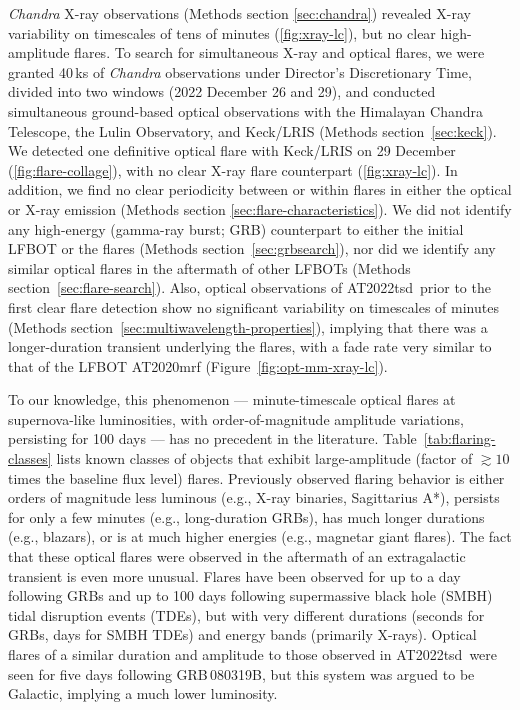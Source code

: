 \documentclass{nature_plusfigure}
\newcommand{\at}{AT2022tsd}
\begin{document}
\emph{Chandra} X-ray observations\cite{Matthews2022} (Methods section \ref{sec:chandra}) revealed X-ray variability on timescales of tens of minutes (\ref{fig:xray-lc}), but no clear high-amplitude flares. To search for simultaneous X-ray and optical flares,
we were granted 40\,ks of {\it Chandra} observations under Director's Discretionary Time, divided into two windows (2022 December 26 and 29),
and conducted simultaneous ground-based optical observations with the Himalayan Chandra Telescope, the Lulin Observatory, and Keck/LRIS (Methods section~\ref{sec:keck}). We detected one definitive optical flare with Keck/LRIS on 29 December (\ref{fig:flare-collage}), with no clear X-ray flare counterpart (\ref{fig:xray-lc}).
In addition, we find no clear periodicity between or within flares in either the optical or X-ray emission (Methods section \ref{sec:flare-characteristics}).
We did not identify any high-energy (gamma-ray burst; GRB) counterpart to either the initial LFBOT or the flares (Methods section~\ref{sec:grbsearch}), nor did we identify any similar optical flares in the aftermath of other LFBOTs (Methods section~\ref{sec:flare-search}).
Also, optical observations of \at\ prior to the first clear flare detection show no significant variability on timescales of minutes (Methods section~\ref{sec:multiwavelength-properties}), implying that there was a longer-duration transient underlying the flares, with a fade rate very similar to that of the LFBOT AT2020mrf\cite{Yao2022} (Figure~\ref{fig:opt-mm-xray-lc}).

To our knowledge, this phenomenon --- minute-timescale optical flares at supernova-like luminosities, with order-of-magnitude amplitude variations, persisting for 100 days --- has no precedent in the literature.
 Table~\ref{tab:flaring-classes} lists known classes of objects that exhibit large-amplitude (factor of $\gtrsim10$ times the baseline flux level) flares. Previously observed flaring behavior is either orders of magnitude less luminous (e.g., X-ray binaries\cite{Fender1997}, Sagittarius A*\cite{Marrone2008}), persists for only a few minutes (e.g., long-duration GRBs\cite{Racusin2008}), has much longer durations (e.g., blazars\cite{Nesci2021}), or is at much higher energies (e.g., magnetar giant flares\cite{Hurley1999}).
The fact that these optical flares were observed in the aftermath of an extragalactic transient is even more unusual.
Flares have been observed for up to a day following GRBs\cite{Kumar2015} and up to 100 days following supermassive black hole (SMBH) tidal disruption events (TDEs\cite{Mangano2016,vanVelzen2021}), but with very different durations (seconds for GRBs, days for SMBH TDEs) and energy bands (primarily X-rays). Optical flares of a similar duration and amplitude to those observed in \at\ were seen for five days following GRB\,080319B, but this system was argued to be Galactic\cite{Kasliwal2008,CastroTirado2008,Stefanescu2008}, implying a much lower luminosity.
\end{document}

